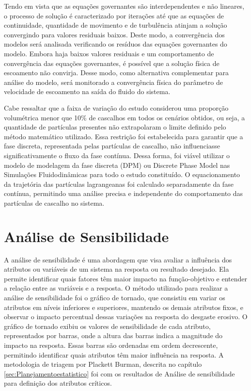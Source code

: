 Tendo em vista que as equações governantes são interdependentes e não lineares, o processo de solução é caracterizado por iterações até que as equações de continuidade, quantidade de movimento e de turbulência atinjam a solução convergindo para valores residuais baixos. Deste modo, a convergência dos modelos será analisada verificando os resíduos das equações governantes do modelo. Embora haja baixos valores residuais e um comportamento de convergência das equações governantes, é possível que a solução física de escoamento não convirja. Desse modo, como alternativa complementar para análise do modelo, será monitorado a convergência física do parâmetro de velocidade de escoamento na saída do fluido do sistema.


Cabe ressaltar que a faixa de variação do estudo considerou uma proporção volumétrica menor que 10\% de cascalhos em todos os cenários obtidos, ou seja, a quantidade de partículas presentes não extrapolaram o limite definido pelo método matemático utilizado. Essa restrição foi estabelecida para garantir que a fase discreta, representada pelas partículas de cascalho, não influenciasse significativamente o fluxo da fase contínua. Dessa forma, foi viável utilizar o modelo de modelagem da fase discreta (DPM) ou Discrete Phase Model nas Simulações Fluidodinâmicas para todo o estudo constituído. O equacionamento da trajetória das partículas lagrangeanas foi calculado separadamente da fase contínua, permitindo uma análise precisa e independente do comportamento das partículas de cascalho no sistema.



\section{Análise de Sensibilidade}

A análise de sensibilidade é uma abordagem que visa avaliar a influência dos atributos ou variáveis de um sistema na resposta ou resultado desejado. Ela permite identificar quais fatores têm maior impacto na função-objetivo e entender a relação entre as variáveis e a resposta. O método utilizado para realizar a análise de sensibilidade foi o gráfico de tornado, que consistiu em variar os atributos em níveis inferiores e superiores, mantendo os demais atributos fixos, e observar o impacto percentual dessas variações na resposta do desgaste erosivo. O gráfico de tornado exibiu os valores de sensibilidade de cada atributo, representados por barras, onde a altura das barras indica a magnitude do impacto na resposta. Essas barras são ordenadas em ordem decrescente, permitindo identificar quais atributos têm maior influência na resposta. A metodologia de triagem por Plackett Burman, descrita no capítulo \ref{sec:Planejamentoestatistico} foi com os resultados de Análise de sensibilidade para definição dos atributos críticos.



